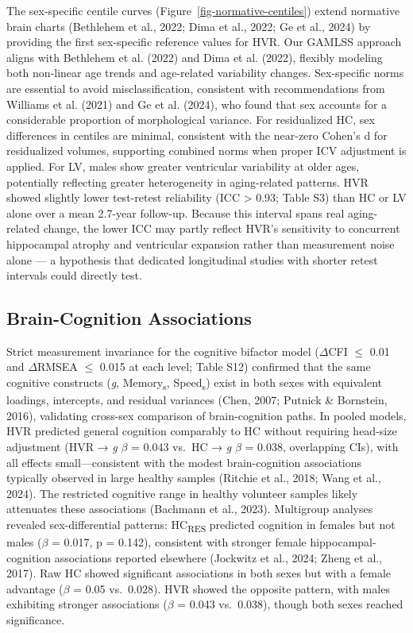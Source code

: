 \documentclass[
]{article}
\begin{document}
The sex-specific centile curves (Figure~\ref{fig-normative-centiles})
extend normative brain charts (Bethlehem et al., 2022; Dima et al.,
2022; Ge et al., 2024) by providing the first sex-specific reference
values for HVR. Our GAMLSS approach aligns with Bethlehem et al. (2022)
and Dima et al. (2022), flexibly modeling both non-linear age trends and
age-related variability changes. Sex-specific norms are essential to
avoid misclassification, consistent with recommendations from Williams
et al. (2021) and Ge et al. (2024), who found that sex accounts for a
considerable proportion of morphological variance. For residualized HC,
sex differences in centiles are minimal, consistent with the near-zero
Cohen's d for residualized volumes, supporting combined norms when
proper ICV adjustment is applied. For LV, males show greater ventricular
variability at older ages, potentially reflecting greater heterogeneity
in aging-related patterns. HVR showed slightly lower test-retest
reliability (ICC \textgreater{} 0.93; Table S3) than HC or LV alone over
a mean 2.7-year follow-up. Because this interval spans real
aging-related change, the lower ICC may partly reflect HVR's sensitivity
to concurrent hippocampal atrophy and ventricular expansion rather than
measurement noise alone --- a hypothesis that dedicated longitudinal
studies with shorter retest intervals could directly test.

\subsection{Brain-Cognition
Associations}\label{brain-cognition-associations-2}

Strict measurement invariance for the cognitive bifactor model
(\(\Delta\)CFI \(\leq\) 0.01 and \(\Delta\)RMSEA \(\leq\) 0.015 at each
level; Table S12) confirmed that the same cognitive constructs
(\emph{g}, Memory\textsubscript{s}, Speed\textsubscript{s}) exist in
both sexes with equivalent loadings, intercepts, and residual variances
(Chen, 2007; Putnick \& Bornstein, 2016), validating cross-sex
comparison of brain-cognition paths. In pooled models, HVR predicted
general cognition comparably to HC without requiring head-size
adjustment (HVR → \emph{g} \(\beta\) = 0.043 vs.~HC → \emph{g} \(\beta\)
= 0.038, overlapping CIs), with all effects small---consistent with the
modest brain-cognition associations typically observed in large healthy
samples (Ritchie et al., 2018; Wang et al., 2024). The restricted
cognitive range in healthy volunteer samples likely attenuates these
associations (Bachmann et al., 2023). Multigroup analyses revealed
sex-differential patterns: HC\textsubscript{RES} predicted cognition in
females but not males (\(\beta\) = 0.017, p = 0.142), consistent with
stronger female hippocampal-cognition associations reported elsewhere
(Jockwitz et al., 2024; Zheng et al., 2017). Raw HC showed significant
associations in both sexes but with a female advantage (\(\beta\) = 0.05
vs.~0.028). HVR showed the opposite pattern, with males exhibiting
stronger associations (\(\beta\) = 0.043 vs.~0.038), though both sexes
reached significance.
\end{document}
